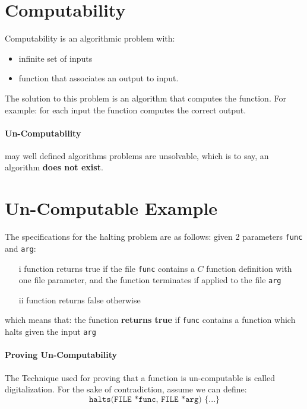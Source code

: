 \documentclass[12pt]{book}
\title{\coursetitle\linebreak\lecturename}
\author{\\Cain Susko\\ 
           \\ \\ \\
      Queen's University 
    \\School of Computing\\}
\begin{document}
\begin{titlepage}
        \maketitle
\end{titlepage}


\section*{Computability}
Computability is an algorithmic problem with:
\begin{itemize}
        \item infinite set of inputs
        \item function that associates an output to input.
\end{itemize}

The solution to this problem is an algorithm that computes the function. For 
example: for each input the function computes the correct output.

\paragraph{Un-Computability}
may well defined algorithms problems are unsolvable, which is to say, an 
algorithm \textbf{does not exist}.

\section*{Un-Computable Example}
The specifications for the halting problem are as follows:
given 2 parameters \texttt{func} and \texttt{arg}:
\begin{itemize}
        \item[i] function returns true if the file \texttt{func} contains a
                $C$ function definition with one file parameter, and the function
                terminates if applied to the file \texttt{arg}
        \item[ii] function returns false otherwise
\end{itemize}

which means that:
the function \textbf{returns true} if \texttt{func} contains a function 
which halts given the input \texttt{arg}

\paragraph*{Proving Un-Computability}
The Technique used for proving that a function is un-computable is called
digitalization. For the sake of contradiction, assume we can define:
\[\texttt{halts(FILE *func, FILE *arg) \{...\}}\]
\pagebreak
\end{document}
